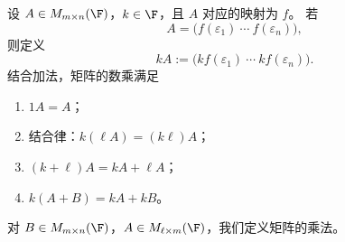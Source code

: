 \begin{definition}[矩阵的数乘]
	设 $A\in M_{m\times n}(\F)$，$k\in\F$，且 $A$ 对应的映射为 $f$。
	若
	\[
	A=\bigl(f(\varepsilon_1)\ \cdots\ f(\varepsilon_n)\bigr),
	\]
	则定义
	\[
	kA:=\bigl(kf(\varepsilon_1)\ \cdots\ kf(\varepsilon_n)\bigr).
	\]
	结合加法，矩阵的数乘满足
	\begin{enumerate}
		\item $1A=A$；
		\item 结合律：$k(\ell A)=(k\ell)A$；
		\item $(k+\ell)A=kA+\ell A$；
		\item $k(A+B)=kA+kB$。
	\end{enumerate}
\end{definition}

对 $B\in M_{m\times n}(\F)$，$A\in M_{\ell\times m}(\F)$，我们定义矩阵的乘法。

